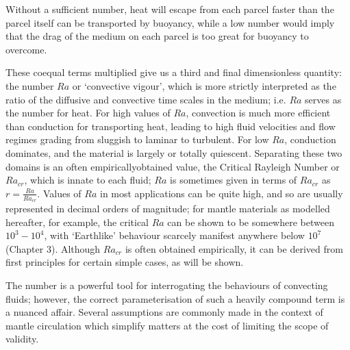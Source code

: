 \documentclass[letterpaper,10pt,english]{jupyterBook}
\begin{document}
\sphinxAtStartPar
Without a sufficient  number, heat will escape from each parcel faster than the parcel itself can be transported by buoyancy, while a low  number would imply that the drag of the medium on each parcel is too great for buoyancy to overcome.

\sphinxAtStartPar
These co\sphinxhyphen{}equal terms multiplied give us a third and final dimensionless quantity: the  number \(Ra\) or ‘convective vigour’, which is more strictly interpreted as the ratio of the diffusive and convective time scales in the medium; i.e. \(Ra\) serves as the  number for heat. For high values of \(Ra\), convection is much more efficient than conduction for transporting heat, leading to high fluid velocities and flow regimes grading from sluggish to laminar to turbulent. For low \(Ra\), conduction dominates, and the material is largely or totally quiescent. Separating these two domains is an often empirically\sphinxhyphen{}obtained value, the Critical Rayleigh Number or \(Ra_{cr}\), which is innate to each fluid; \(Ra\) is sometimes given in terms of \(Ra_{cr}\) as \(r = \frac{Ra}{Ra_{cr}}\). Values of \(Ra\) in most applications can be quite high, and so are usually represented in decimal orders of magnitude; for mantle materials as modelled hereafter, for example, the critical \(Ra\) can be shown to be somewhere between \(10^3-10^4\), with ‘Earthlike’ behaviour scarcely manifest anywhere below \(10^7\) (Chapter 3). Although \(Ra_{cr}\) is often obtained empirically, it can be derived from first principles for certain simple cases, as will be shown.

\sphinxAtStartPar
The  number is a powerful tool for interrogating the behaviours of convecting fluids; however, the correct parameterisation of such a heavily compound term is a nuanced affair. Several assumptions are commonly made in the context of mantle circulation which simplify matters at the cost of limiting the scope of validity.
\end{document}
